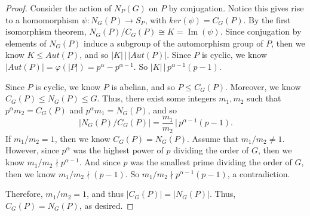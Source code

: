 \documentclass[10pt]{article}
\newcommand{\divides}{\, \Big | \,}
\renewcommand{\phi}{\varphi}
\begin{document}
\begin{itemize}
\begin{proof}
Consider the action of $N_P(G)$ on $P$ by conjugation. Notice this gives rise to a homomorphism $\psi: N_G(P) \to S_P$, with $ker(\psi) = C_G(P)$. By the first isomorphism theorem, $N_G(P)/C_G(P) \cong K = \operatorname{Im}(\psi)$. Since conjugation by elements of $N_G(P)$ induce a subgroup of the automorphism group of $P$, then we know $K \leq Aut(P)$, and so $|K| \divides |Aut(P)|$. Since $P$ is cyclic, we know $|Aut(P)| = \phi(|P|) = p^\alpha - p^{\alpha - 1}$. So $|K| \divides p^{\alpha-1}(p-1)$. 

Since $P$ is cyclic, we know $P$ is abelian, and so $P \leq C_G(P)$. Moreover, we know $C_G(P) \leq N_G(P) \leq G$. Thus, there exist some integers $m_1,m_2$ such that $p^{\alpha} m_2 = C_G(P)$ and $p^\alpha m_1 = N_G(P)$, and so
$$|N_G(P)/C_G(P)| = \frac{m_1}{m_2} \divides p^{\alpha-1}(p-1).$$
If $m_1/m_2 = 1$, then we know $C_G(P) = N_G(P)$. Assume that $m_1/m_2 \neq 1$. However, since $p^{\alpha}$ was the highest power of $p$ dividing the order of $G$, then we know $m_1/m_2 \nmid p^{\alpha - 1}$. And since $p$ was the smallest prime dividing the order of $G$, then we know $m_1/m_2 \nmid (p-1)$. So $m_1/m_2 \nmid p^{\alpha-1}(p-1)$, a contradiction. 

Therefore, $m_1/m_2 = 1$, and thus $|C_G(P)| = |N_G(P)|$. Thus, $C_G(P) = N_G(P)$, as desired. 

\end{proof}

\end{itemize}

 
\end{document}
